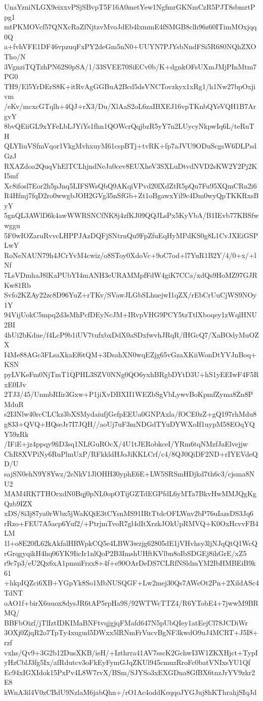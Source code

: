 UnaYzniNLGX9eixxvPSjSBvpT5F16A0metYew1NgfmrGKNmCzR5PJT8sbmrtPpg1
mtPKMOVcf57QNXcRaZfNjtzvMvoJdEb4lxmmE4fSMGB8clh96z60ITimMOxjqq0Q
a+fvhVFE1DF46vpzuqFxPY2deGm5nN0+UUYN7PJYsbNndFSi5R680NQhZXOTho/N
3VgnziTQTzhPN62S0pSA/1/33SVEE70SiECv0b/K+dgnkOFsUXmJMjPInMtm7PG0
TH9/El5YrDErS8K+itRvAgGGBuA2Bcd5dsVNCTovzkyx1xRg1/h1Nw27bpOxjivm
/eKv/mcxcGTqlh+4QJ+rX3/Du/XlAaS2oL6zaIBXEJ16vpTKnbQYeVQH1B7ArgvY
8bvQEiiGL9xYFeLbLJYiYs1fhn1QOWcrQqjbzR5yY7n2LUycyNkpwIq6L/teRuTH
QLYIiuVSfmVqor1VkgMvhxuyM61cspBTj+tvRK+fp7aJVU9ODuScgsW6DLPsdGzJ
RXAZdoa2QuqVhElTCLhjndNeJa0cev8EUXheV3SXLuDtvdNVD2sKW2Y2Pj2KI5mf
Xc8ifosl7Eor2h5pJnq5LIFSWsQbQ9AKqiVPvd20lXdZtR5pQu7Fu95XQmCRn2i6
R4Hfmj7fqD2ro0wwgbJOH2GVg35nSfGb+Zt1oBgawxYil9c4Dm0wyQpTKKRxsByY
5gnQL3AWlD6k4awWWRSNCfNK8j4zfKJ09QQJLsPx5KyVbA/B1IEvb77KBSfwwggu
5F0wIOZaruRvvcLHPPJAzDQFjSNtrnQu9FpZfuEqHyMPdKS0g8L1CvJXEiGSPLwY
RoNeNAUN79h4JCrYvM4cwiz/o8SToy0XdoVc+9oC7od+l7YuR1B2Y/4/0+x/+lNf
7LsVDmhaJ8lKaPUbYI4mANH3eURAMMpfFdW4giK7CCa/xdQs9HoMZ97GJRKw81Rb
Svfo2KZAy22zc8D96YuZ+rTKv/SVawJLGbSLhuejwI1qZX/rEbCrUuCjWS9NOy1Y
94VijUokC5mpq2d3sMhPcfDEyNcJM+IRvpVHG9PCY5tzTtlXboqey1zWqlHNU2BI
4hUi2bKdne/f4LcP9b1iUV7tufxbxDdX0aSDxfwvhJRqR/fHGcQ7/XaBOdyMuOZX
I4Me88AGc3FLsaXkaEf6tQM+3DsahXN0wqEZjg65vGzaXKiiWonDtYVJnBoq+KSN
pyLVKeFm0NjTmT1QPHL3SZV0NNg0QO6yxhBRgbDYtD3U+hS1yEEIwF4F5RxE0IJv
2TJ3/45/UnmbRIir3Gxw+P1jiXvDBXII1WEZbSgVbLywvBoKpmfZyma8Zn8PMduR
s2I3Nlw40rcCLCkz3bXSMydaiufjGefpEEUa0GNPAxla/fOCE0zZ+gQ197rhMdu8
g833+QVQ+HQseJr7I7JQH//aoUj7uF3mNDGdTYuDYWXoIf1uypM58EOqYQY59zRk
/IFiE+jz4ppqy9fiD3sq1NLfGuROcX/4U1tJERobkceI/YRm6tqNMzfJaElvejjw
ChR8XVPiNy6RuPlmUxP/RFkkldHJoJiKKLCrf/c4/8QJ0QiDF2ND+rIYEVdeQD/U
sajSN0ehN9Y8Ywz/2eNkV1JlOHH30yphE6E+LW5SRSmHDjkd7th6c3/cjsma8NU2
MAM4RK7THOrxdN0Bqj0pNL0opOTijGZTdEGPfdL6yMTa7BkvHwMMJQgKgQzb9IZX
xDS/8i3j87ya0rWbx5jWaKQiE3tCYsnMS91IRtTtdcOFLWnv2bP76uIazsDS3Jq6
rRzo+FEU7A5acp6Yuf2/+PtrjmTvoR7gl4dItXrzkJOkUpRMVQ+K0OxHcvvFB4LM
1l+o8E20fL62kAkfalHRWpkCQ5e4LBW3wzjg62805dE1jVHvhsy3ljNJqQtQ1WcQ
rGrqgyqikH4hq06YK9IicIr1nlQoP2B3ImshUHftKVlbn8oIbSDGEj8ihGrE/xZ5
r9c7p3/eU2Qx6xA1pmuiFrzx8+4f+e90OArDeDS7CLRfNSldmYM2IbHMBEiB9k61
+hkpIQZci6XB+YGpYk8So1MbNUSQGF+Lw2mej30Qs7AWcOt2Pn+2XildASc4TdNT
oAO1f+birX6uuox8dysJR6tAP5rpHa9S/92WTWcTTZ4/R6YTobE4+7jwwM9BRMQ/
BBFbOizf/jTlIztIDKIMaBNFtvqjgjqFMafd647N5pUbQIey1atEejCl78JCDiWr
3OXj0ZjqR2o7TpTy4xugud5DWxx5lRNmFrVucvBgNF3kwdO9uJ4MCRT+J5I8+rzf
vxhs/Qv9+3G2b12DusXKB/ieH/+Izthrra41AV7sscK2GchwI3W1ZKXHjct+TypI
yHzCblJ3fg5Ix/afRdutcv3oFkEyFymGJqZKUl945cmuzRroFc0batVNIxsYU1Qf
Ec94xIGXIdok15PxPv4L8W7rvX/BSm/SJYSo3xEXGDna8GfBX6tnzJrYV9zkr2E8
kWnA3il4V0zCBdU9NzlaM6jabQhn+/rO1Ac4oddKeqqoJYGJuj8hKThrahjSIqJd
